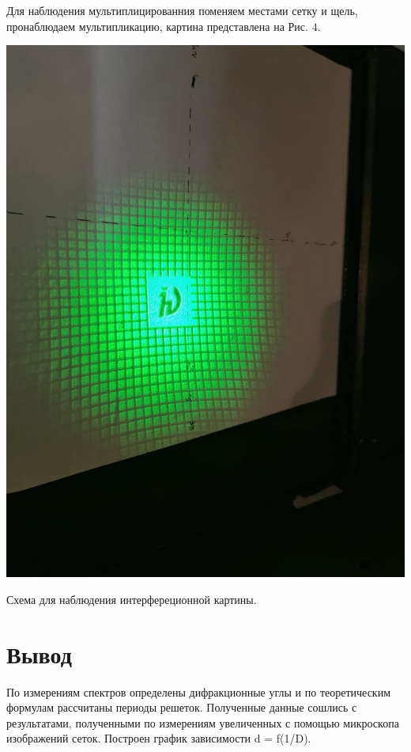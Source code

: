  
 \begin{minipage}{0.40\textwidth}
\begin{center}
 Для наблюдения мультиплицированния поменяем местами сетку и щель, пронаблюдаем мультипликацию, картина представлена на Рис. $4 .$

\end{center}
\end{minipage}
\begin{minipage}{0.40\textwidth}
\begin{center}

\includegraphics[width = \textwidth]{images/5.jpg}
\end{center}

\begin{center}
Схема для наблюдения интерфереционной картины.

\end{center}
\end{minipage}
\section*{Вывод}

По измерениям спектров определены дифракционные углы и по теоретическим формулам рассчитаны периоды решеток. Полученные данные сошлись с результатами, полученными по измерениям увеличенных с помощью микроскопа изображений сеток. Построен график зависимости d = f(1/D).

